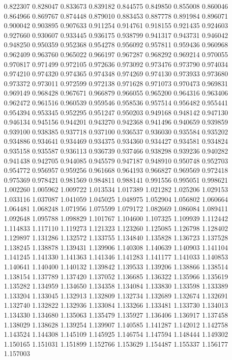 0.822307
0.828047
0.833673
0.839182
0.844575
0.849850
0.855008
0.860046
0.864966
0.869767
0.874448
0.879010
0.883453
0.887778
0.891984
0.896071
0.900042
0.903895
0.907633
0.911254
0.914761
0.918155
0.921435
0.924603
0.927660
0.930607
0.933445
0.936175
0.938799
0.941317
0.943731
0.946042
0.948250
0.950359
0.952368
0.954278
0.956092
0.957811
0.959436
0.960968
0.962409
0.963760
0.965022
0.966197
0.967287
0.968292
0.969214
0.970055
0.970817
0.971499
0.972105
0.972636
0.973092
0.973476
0.973790
0.974034
0.974210
0.974320
0.974365
0.974348
0.974269
0.974130
0.973933
0.973680
0.973372
0.973011
0.972599
0.972138
0.971628
0.971073
0.970473
0.969831
0.969149
0.968428
0.967671
0.966879
0.966055
0.965200
0.964316
0.963406
0.962472
0.961516
0.960539
0.959546
0.958536
0.957514
0.956482
0.955441
0.954394
0.953345
0.952295
0.951247
0.950203
0.949168
0.948142
0.947130
0.946134
0.945156
0.944201
0.943270
0.942368
0.941496
0.940659
0.939859
0.939100
0.938385
0.937718
0.937100
0.936537
0.936030
0.935584
0.935202
0.934886
0.934641
0.934469
0.934375
0.934360
0.934427
0.934581
0.934824
0.935158
0.935587
0.936113
0.936739
0.937466
0.938298
0.939236
0.940282
0.941438
0.942705
0.944085
0.945579
0.947187
0.948910
0.950748
0.952703
0.954772
0.956957
0.959256
0.961668
0.964193
0.966827
0.969569
0.972418
0.975369
0.978421
0.981569
0.984811
0.988141
0.991556
0.995051
0.998621
1.002260
1.005962
1.009722
1.013534
1.017389
1.021282
1.025206
1.029153
1.033116
1.037087
1.041059
1.045025
1.048975
1.052904
1.056802
1.060664
1.064481
1.068248
1.071956
1.075599
1.079172
1.082669
1.086084
1.089411
1.092648
1.095788
1.098829
1.101767
1.104600
1.107325
1.109939
1.112442
1.114833
1.117110
1.119273
1.121323
1.123260
1.125085
1.126798
1.128402
1.129897
1.131286
1.132572
1.133755
1.134840
1.135828
1.136723
1.137528
1.138245
1.138878
1.139431
1.139906
1.140308
1.140639
1.140903
1.141104
1.141245
1.141330
1.141363
1.141346
1.141283
1.141177
1.141033
1.140853
1.140641
1.140400
1.140132
1.139842
1.139533
1.139206
1.138866
1.138514
1.138154
1.137789
1.137420
1.137052
1.136685
1.136322
1.135966
1.135619
1.135282
1.134959
1.134650
1.134358
1.134084
1.133830
1.133598
1.133389
1.133204
1.133045
1.132913
1.132809
1.132734
1.132689
1.132674
1.132691
1.132740
1.132822
1.132936
1.133084
1.133266
1.133481
1.133730
1.134013
1.134330
1.134680
1.135063
1.135479
1.135927
1.136406
1.136917
1.137458
1.138029
1.138628
1.139254
1.139907
1.140585
1.141287
1.142012
1.142758
1.143524
1.144308
1.145109
1.145925
1.146754
1.147594
1.148444
1.149302
1.150165
1.151031
1.151899
1.152766
1.153629
1.154487
1.155337
1.156177
1.157003
